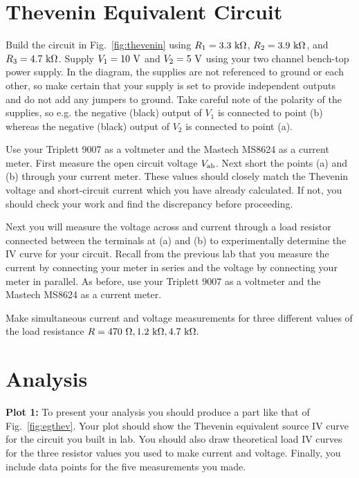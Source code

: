 \section{Thevenin Equivalent Circuit}

Build the circuit in Fig.~\ref{fig:thevenin} using $R_1 = 3.3~\rm
k\Omega$, $R_2 = 3.9~\rm k\Omega$, and $R_3 = 4.7~\rm k\Omega$.
Supply $V_1 = 10~\rm V$ and $V_2 = 5~\rm V$ using your two channel
bench-top power supply.  In the diagram, the supplies are not
referenced to ground or each other, so make certain that your supply
is set to provide independent outputs and do not add any jumpers to
ground.  Take careful note of the polarity of the supplies, so
e.g. the negative (black) output of $V_1$ is connected to point (b)
whereas the negative (black) output of $V_2$ is connected to point
(a).

Use your Triplett 9007 as a voltmeter and the Mastech MS8624 as a
current meter.  First measure the open circuit voltage $V_{\rm ab}$.
Next short the points (a) and (b) through your current meter.  These
values should closely match the Thevenin voltage and short-circuit
current which you have already calculated.  If not, you should check
your work and find the discrepancy before proceeding.

Next you will measure the voltage across and current through a load
resistor connected between the terminals at (a) and (b) to
experimentally determine the IV curve for your circuit.  Recall from
the previous lab that you measure the current by connecting your meter
in series and the voltage by connecting your meter in parallel.  As
before, use your Triplett 9007 as a voltmeter and the Mastech MS8624
as a current meter.

Make simultaneous current and voltage measurements for three different
values of the load resistance $R = 470~{\rm \Omega}, 1.2~\rm k\Omega,
4.7~\rm k\Omega.$


\section{Analysis}

{\bf Plot 1:} To present your analysis you should produce a part like
that of Fig.~\ref{fig:egthev}.  Your plot should show the Thevenin
equivalent source IV curve for the circuit you built in lab.  You
should also draw theoretical load IV curves for the three resistor
values you used to make current and voltage.  Finally, you include
data points for the five measurements you made.

